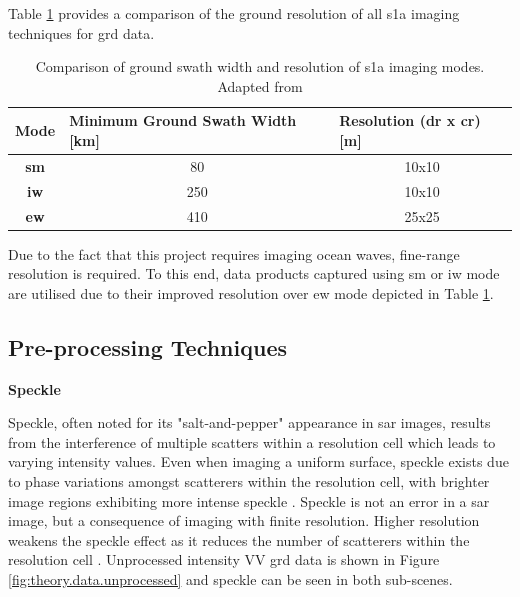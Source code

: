 Table \ref{tab:theory.s1aImagingParams} provides a comparison of the ground resolution of all \acs{s1a} imaging techniques for \acs{grd} data.

\begin{table}[htbp]
\centering
\begin{tabular}{|c|c|c|}
\hline
\textbf{Mode} & \multicolumn{1}{l|}{\textbf{Minimum Ground Swath Width {[}km{]}}} & \multicolumn{1}{l|}{\textbf{Resolution (dr x cr) {[}m{]}}} \\ \hline
\textbf{\acs{sm}} & 80 & 10x10 \\ \hline
\textbf{\acs{iw}} & 250 & 10x10 \\ \hline
\textbf{\acs{ew}} & 410 & 25x25 \\ \hline
\end{tabular}
\caption{Comparison of ground swath width and resolution of \acs{s1a} imaging modes. Adapted from \cite{sentinel1ProductDef}}
\label{tab:theory.s1aImagingParams}
\end{table}

Due to the fact that this project requires imaging ocean waves, fine-range resolution is required. To this end, data products captured using \acs{sm} or \acs{iw} mode are utilised due to their improved resolution over \acs{ew} mode depicted in Table \ref{tab:theory.s1aImagingParams}.






\subsection{Pre-processing Techniques} \label{subsec:theory.sar.preProcess}

\textbf{Speckle}

Speckle, often noted for its "salt-and-pepper" appearance \cite{Meyer2019} in \acs{sar} images, results from the interference of multiple scatters within a resolution cell which leads to varying intensity values. Even when imaging a uniform surface, speckle exists due to phase variations amongst scatterers within the resolution cell, with brighter image regions exhibiting more intense speckle \cite{Moreira2013,Meyer2019}. Speckle is not an error in a \acs{sar} image, but a consequence of imaging with finite resolution. Higher resolution weakens the speckle effect as it reduces the number of scatterers within the resolution cell \cite{Meyer2019}. Unprocessed intensity VV \acs{grd} data is shown in Figure \ref{fig:theory.data.unprocessed} and speckle can be seen in both sub-scenes.

